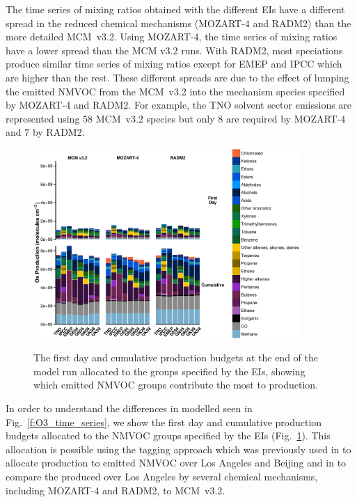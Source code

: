 \documentclass[14pt]{extarticle}
\begin{document}
The time series of  mixing ratios obtained with the different EIs have a different spread in the reduced chemical mechanisms (MOZART-4 and RADM2) than the more detailed MCM~v3.2.
Using MOZART-4, the time series of  mixing ratios have a lower spread than the MCM v3.2 runs.
With RADM2, most speciations produce similar time series of  mixing ratios except for EMEP and IPCC which are higher than the rest.
These different spreads are due to the effect of lumping the emitted NMVOC from the MCM~v3.2 into the mechanism species specified by MOZART-4 and RADM2.
For example, the TNO solvent sector emissions are represented using $58$ MCM~v3.2 species but only $8$ are required by MOZART-4 and $7$ by RADM2.

\begin{figure}
    \centering
    \caption{The first day and cumulative  production budgets at the end of the model run allocated to the groups specified by the EIs, showing which emitted NMVOC groups contribute the most to  production.}
    \includegraphics[width=0.9\textwidth]{Scientific_Writing_Course/Pictures/Cumulative_Ox_budget_allocated_facet_mechanism}
    \label{f:Ox_budget}
    \vspace{-2mm}
\end{figure}
In order to understand the differences in modelled  seen in Fig.~\ref{f:O3_time_series}, we show the first day and cumulative  production budgets allocated to the NMVOC groups specified by the EIs (Fig.~\ref{f:Ox_budget}). 
This allocation is possible using the tagging approach which was previously used in \citet{Butler:2011} to allocate  production to emitted NMVOC over Los Angeles and Beijing and in \citet{Coates:2015} to compare the  produced over Los Angeles by several chemical mechanisms, including MOZART-4 and RADM2, to MCM~v3.2.
\end{document}
